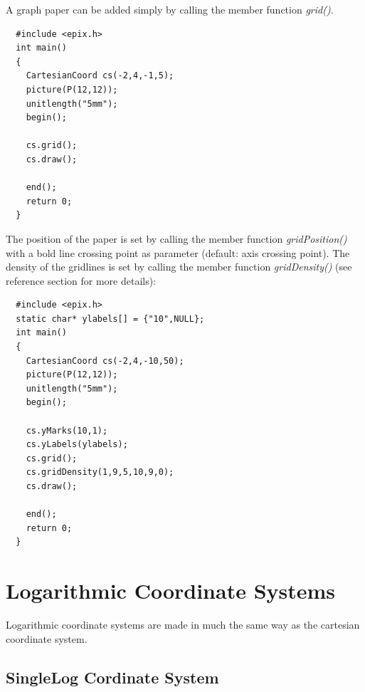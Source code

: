 \documentclass[12pt,a4paper]{article}
\begin{document}
  A graph paper can be added simply by calling the member function
  \textit{grid()}.

  \begin{minipage}{7.5cm}
    \begin{lstlisting}
  #include <epix.h>
  int main()
  {
    CartesianCoord cs(-2,4,-1,5);
    picture(P(12,12));
    unitlength("5mm");
    begin();

    cs.grid();
    cs.draw();

    end();
    return 0;
  }
    \end{lstlisting}
  \end{minipage}
  \begin{minipage}{5.5cm}
    
  \end{minipage}


  The position of the paper is set by calling the member function
  \textit{gridPosition()} with a bold line crossing point as parameter
  (default: axis crossing point). The density of the gridlines is set
  by calling the member function \textit{gridDensity()} (see reference
  section for more details):

  \begin{minipage}{7.5cm}
    \begin{lstlisting}
  #include <epix.h>
  static char* ylabels[] = {"10",NULL};
  int main()
  {
    CartesianCoord cs(-2,4,-10,50);
    picture(P(12,12));
    unitlength("5mm");
    begin();

    cs.yMarks(10,1);
    cs.yLabels(ylabels);
    cs.grid();
    cs.gridDensity(1,9,5,10,9,0);
    cs.draw();

    end();           
    return 0;
  }
    \end{lstlisting}
  \end{minipage}
  \begin{minipage}{5.5cm}
    \vspace{1.0cm}
    
  \end{minipage}


  \newpage
  \section{Logarithmic Coordinate Systems}

  Logarithmic coordinate systems are made in much the same way as the
  cartesian coordinate system.

  \subsection{SingleLog Cordinate System}
\end{document}
